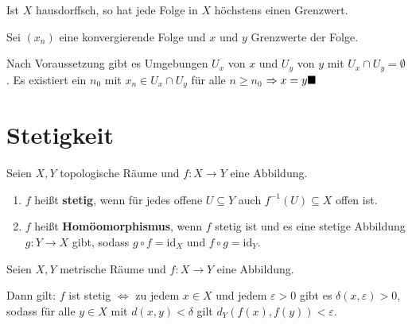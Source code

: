 \begin{korollar}
    Ist $X$ hausdorffsch, so hat jede Folge in $X$ höchstens einen
    Grenzwert.
\end{korollar}

\begin{beweis}
    Sei $(x_n)$ eine konvergierende Folge und $x$ und $y$ Grenzwerte der Folge.

    Nach Voraussetzung gibt es Umgebungen $U_x$ von $x$ und $U_y$
    von $y$ mit $U_x \cap U_y = \emptyset$. Es existiert ein
    $n_0$ mit $x_n \in U_x \cap U_y$ für alle $n \geq n_0$
    $\Rightarrow x = y \qed$
\end{beweis}

\section{Stetigkeit}
\begin{definition}  
    Seien $X, Y$ topologische Räume und $f:X \rightarrow Y$ eine Abbildung.

    \begin{enumerate}[label=\alph*),ref=\theplaindefinition.\alph*]
        \item $f$ heißt \textbf{stetig}, wenn für jedes offene 
              $U \subseteq Y$ auch $f^{-1} (U) \subseteq X$ offen ist. \label{def:stetigkeit}
        \item $f$ heißt \textbf{Homöomorphismus}, wenn $f$ stetig ist
              und es eine 
              stetige Abbildung  $g: Y \rightarrow X$ gibt, sodass
              $g \circ f = \text{id}_X$ und $f \circ g = \text{id}_Y$.
    \end{enumerate}
\end{definition}

\begingroup
\renewcommand{\thmfoot}{\footnotemark}
\begin{korollar}
  Seien $X, Y$ metrische Räume und $f\colon X \rightarrow Y$ eine
  Abbildung.

  Dann gilt: $f$ ist stetig $\Leftrightarrow$ zu jedem $x \in X$ und
  jedem $\varepsilon > 0$ gibt es $\delta(x, \varepsilon) > 0$, sodass
  für alle $y \in X$ mit $d(x,y) < \delta $ gilt $d_Y(f(x), f(y)) <
  \varepsilon$.
\end{korollar}
\endgroup

